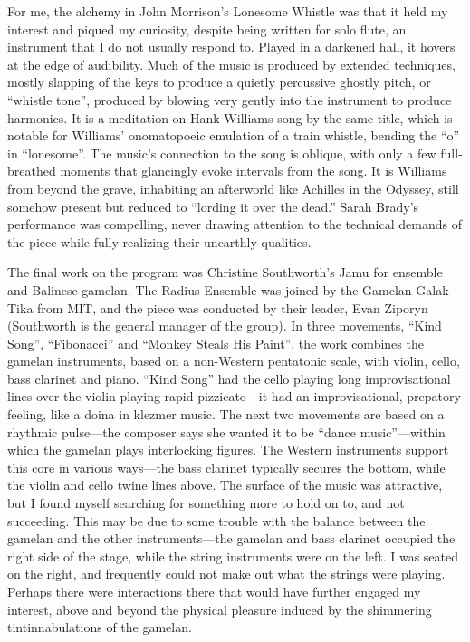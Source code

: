 For me, the alchemy in John Morrison’s Lonesome Whistle was that it held my interest and piqued my curiosity, despite being written for solo flute, an instrument that I do not usually respond to. Played in a darkened hall, it hovers at the edge of audibility. Much of the music is produced by extended techniques, mostly slapping of the keys to produce a quietly percussive ghostly pitch, or “whistle tone”, produced by blowing very gently into the instrument to produce harmonics. It is a meditation on Hank Williams song by the same title, which is notable for Williams’ onomatopoeic emulation of a train whistle, bending the “o” in “lonesome”. The music’s connection to the song is oblique, with only a few full-breathed moments that glancingly evoke intervals from the song. It is Williams from beyond the grave, inhabiting an afterworld like Achilles in the Odyssey, still somehow present but reduced to “lording it over the dead.” Sarah Brady’s performance was compelling, never drawing attention to the technical demands of the piece while fully realizing their unearthly qualities.

The final work on the program was Christine Southworth’s Jamu for ensemble and Balinese gamelan. The Radius Ensemble was joined by the Gamelan Galak Tika from MIT, and the piece was conducted by their leader, Evan Ziporyn (Southworth is the general manager of the group). In three movements, “Kind Song”, “Fibonacci” and “Monkey Steals His Paint”, the work combines the gamelan instruments, based on a non-Western pentatonic scale, with violin, cello, bass clarinet and piano. “Kind Song” had the cello playing long improvisational lines over the violin playing rapid pizzicato—it had an improvisational, prepatory feeling, like a doina in klezmer music. The next two movements are based on a rhythmic pulse—the composer says she wanted it to be “dance music”—within which the gamelan plays interlocking figures. The Western instruments support this core in various ways—the bass clarinet typically secures the bottom, while the violin and cello twine lines above. The surface of the music was attractive, but I found myself searching for something more to hold on to, and not succeeding. This may be due to some trouble with the balance between the gamelan and the other instruments—the gamelan and bass clarinet occupied the right side of the stage, while the string instruments were on the left. I was seated on the right, and frequently could not make out what the strings were playing. Perhaps there were interactions there that would have further engaged my interest, above and beyond the physical pleasure induced by the shimmering  tintinnabulations of the gamelan.
